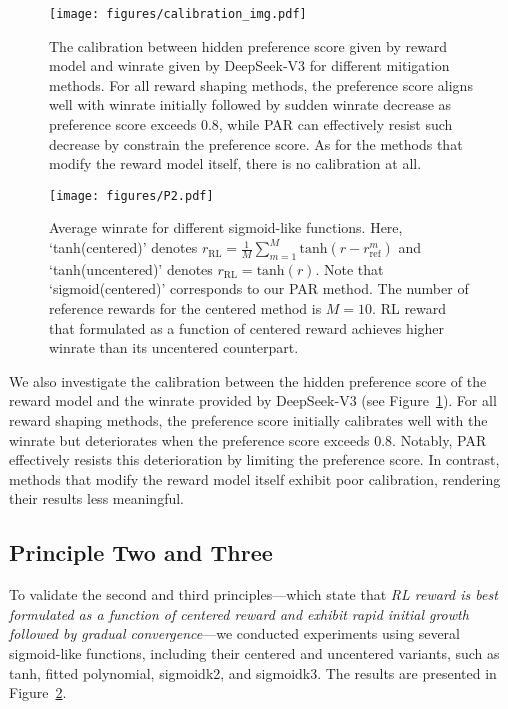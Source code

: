 \begin{figure}[t]
\centering
\texttt{[image: figures/calibration\_img.pdf]}
\caption{The calibration between hidden preference score given by reward model and winrate given by DeepSeek-V3 for different mitigation methods. For all reward shaping methods, the preference score aligns well with winrate initially followed by sudden winrate decrease as preference score exceeds 0.8, while PAR can effectively resist such decrease by constrain the preference score. As for the methods that modify the reward model itself, there is no calibration at all.}
\label{fig:calibration}
\end{figure}
\label{subsection:P2}

\begin{figure}[t]
\centering
\texttt{[image: figures/P2.pdf]}
\caption{Average winrate for different sigmoid-like functions. Here, `tanh(centered)' denotes $r_{\text{RL}}=\frac{1}{M}\sum_{m=1}^M\text{tanh}(r-r_{\text{ref}}^m)$ and `tanh(uncentered)' denotes $r_{\text{RL}}=\text{tanh}(r)$. Note that `sigmoid(centered)' corresponds to our PAR method. The number of reference rewards for the centered method is $M=10$. RL reward that formulated as a function of centered reward achieves higher winrate than its uncentered counterpart.}
\label{fig:P2}
\end{figure}
We also investigate the calibration between the hidden preference score of the reward model and the winrate provided by DeepSeek-V3 (see Figure~\ref{fig:calibration}). For all reward shaping methods, the preference score initially calibrates well with the winrate but deteriorates when the preference score exceeds 0.8. Notably, PAR effectively resists this deterioration by limiting the preference score. In contrast, methods that modify the reward model itself exhibit poor calibration, rendering their results less meaningful.

\subsection{Principle Two and Three}
To validate the second and third principles—which state that \emph{RL reward is best formulated as a function of centered reward and exhibit rapid initial growth followed by gradual convergence}—we conducted experiments using several sigmoid-like functions, including their centered and uncentered variants, such as tanh, fitted polynomial, sigmoidk2, and sigmoidk3. The results are presented in Figure~\ref{fig:P2}.

